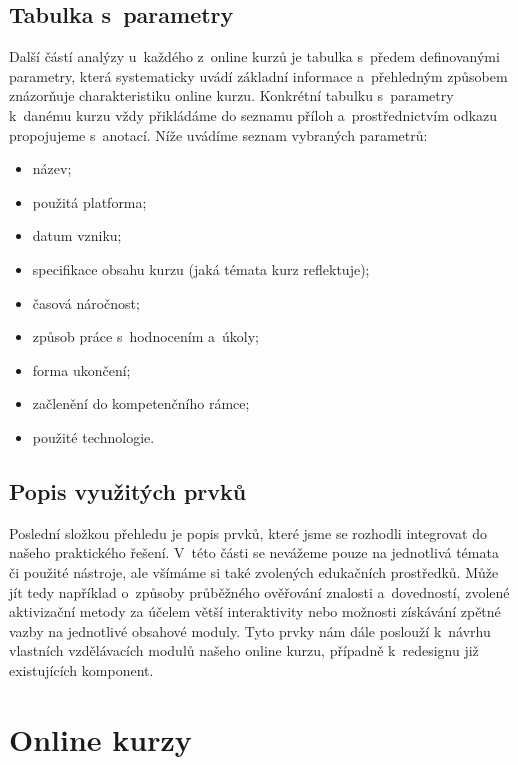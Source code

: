 \hypertarget{tabulka-s-parametry}{%
\subsection{Tabulka s~parametry}\label{tabulka-s-parametry}}

Další částí analýzy u~každého z~online kurzů je tabulka s~předem definovanými parametry, která systematicky uvádí základní informace a~přehledným způsobem znázorňuje charakteristiku online kurzu. Konkrétní tabulku s~parametry k~danému kurzu vždy přikládáme do seznamu příloh a~prostřednictvím odkazu propojujeme s~anotací. Níže uvádíme seznam vybraných parametrů:

\begin{itemize}
\tightlist
\item
  název;
\item
  použitá platforma;
\item
  datum vzniku;
\item
  specifikace obsahu kurzu (jaká témata kurz reflektuje);
\item
  časová náročnost;
\item
  způsob práce s~hodnocením a~úkoly;
\item
  forma ukončení;
\item
  začlenění do kompetenčního rámce;
\item
  použité technologie.
\end{itemize}

\hypertarget{popis-vyuux17eituxfdch-prvkux16f}{%
\subsection{Popis využitých prvků}\label{popis-vyuux17eituxfdch-prvkux16f}}

Poslední složkou přehledu je popis prvků, které jsme se rozhodli integrovat do našeho praktického řešení. V~této části se nevážeme pouze na jednotlivá témata či použité nástroje, ale všímáme si také zvolených edukačních prostředků. Může jít tedy například o~způsoby průběžného ověřování znalosti a~dovedností, zvolené aktivizační metody za účelem větší interaktivity nebo možnosti získávání zpětné vazby na jednotlivé obsahové moduly. Tyto prvky nám dále poslouží k~návrhu vlastních vzdělávacích modulů našeho online kurzu, případně k~redesignu již existujících komponent.

\hypertarget{online-kurzy}{%
\section{Online kurzy}\label{online-kurzy}}

